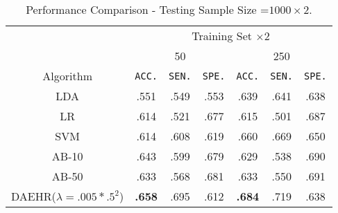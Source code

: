 \documentclass{article}
\begin{document}
\begin{table*}
\footnotesize{
\begin{center}
\caption{Performance Comparison - Testing Sample Size =$1000\times 2$.}
		\label{tab:table13_compressed}
\begin{tabular}{*{7}{c}}
\toprule
    &  \multicolumn{6}{c}{Training Set $\times 2$}\\
    \cmidrule(lr){2-7}
    &  
    \multicolumn{3}{c}{50} &
    \multicolumn{3}{c}{250} \\
\cmidrule(lr){2-4}
\cmidrule(lr){5-7}
Algorithm & \texttt{ACC.} & \texttt{SEN.} & \texttt{SPE.} &
                           \texttt{ACC.} & \texttt{SEN.} & \texttt{SPE.} \\
 \cmidrule(lr){1-1}                        
 \cmidrule(lr){2-4}
\cmidrule(lr){5-7}
    LDA &   .551 & .549 & .553 &     .639 & .641 & .638 \\
 
     \cmidrule(lr){1-1}                        
 \cmidrule(lr){2-4}
\cmidrule(lr){5-7}
    LR &   .614 & .521 & .677 &     .615 & .501 & .687 \\
    
    \cmidrule(lr){1-1}                        
 \cmidrule(lr){2-4}
\cmidrule(lr){5-7}
    SVM  &   .614 & .608 & .619 &     .660 & .669 & .650 \\
    \cmidrule(lr){1-1}                        
 \cmidrule(lr){2-4}
\cmidrule(lr){5-7}

   AB-10 &   .643 & .599& .679 &     .629 & .538& .690     \\   
   \cmidrule(lr){1-1}                        
 \cmidrule(lr){2-4}
\cmidrule(lr){5-7}
			
    AB-50 &    .633 & .568 & .681 &     .633 & .550 & .691      \\

     \cmidrule(lr){1-1}                        
 \cmidrule(lr){2-4}
\cmidrule(lr){5-7}
     DAEHR($\lambda=.005*.5^{2}$) &  \textbf{.658} & .695 & .612 &     \textbf{.684} & .719 & .638     \\
       
     \bottomrule
 
\end{tabular}

\end{center}
}
\end{table*}
\end{document}
